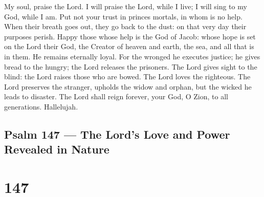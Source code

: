  My soul, praise the Lord.  I will praise the
Lord, while I live; I will sing to my God, while I am.  Put
not your trust in princes mortals, in whom is no help.  When
their breath goes out, they go back to the dust: on that very day their
purposes perish.  Happy those whose help is the God of
Jacob: whose hope is set on the Lord their God,  the Creator
of heaven and earth, the sea, and all that is in them. He remains
eternally loyal.  For the wronged he executes justice; he
gives bread to the hungry; the Lord releases the prisoners. 
The Lord gives sight to the blind: the Lord raises those who are bowed.
The Lord loves the righteous.  The Lord preserves the
stranger, upholds the widow and orphan, but the wicked he leads to
disaster.  The Lord shall reign forever, your God, O Zion,
to all generations. Hallelujah.

\hypertarget{psalm-147-the-lords-love-and-power-revealed-in-nature}{%
\subsection{Psalm 147 --- The Lord's Love and Power Revealed in
Nature}\label{psalm-147-the-lords-love-and-power-revealed-in-nature}}

\hypertarget{section-146}{%
\section{147}\label{section-146}}

